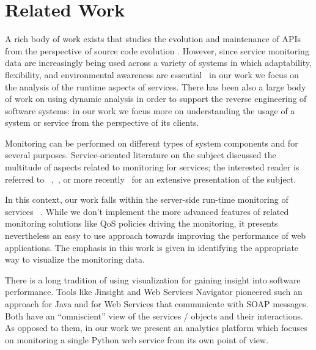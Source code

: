 
\section{Related Work}
\label{sec:related}



A rich body of work exists that studies the evolution and maintenance of APIs from the perspective of source code evolution \cite{dig2006apis, hora2015developers, hora2015apiwave}. However, since service monitoring data are increasingly being used across a variety of systems in which adaptability, flexibility, and environmental awareness are essential~\cite{pernici2016monitoring} in our work we focus on the analysis of the runtime aspects of services. There has been also a large body of work on using dynamic analysis in order to support the reverse engineering of software systems\cite{Corn09-dynamic}: in our work we focus more on understanding the usage of a system or service from the perspective of its clients.

Monitoring can be performed on different types of system components and for several purposes. Service-oriented literature on the subject discussed the multitude of aspects related to monitoring for services; the interested reader is referred to ~\cite{ghezzi2007run},~\cite{metzger2010analytical}, or more recently~\cite{pernici2016monitoring} for an extensive presentation of the subject. 



In this context, our work falls within the server-side run-time monitoring of services ~\cite{ghezzi2007run}. While we don't implement the more advanced features of related monitoring solutions like QoS policies driving the monitoring, it presents nevertheless an easy to use approach towards improving the performance of web applications. The emphasis in this work is given in identifying the appropriate way to visualize the monitoring data.
  
There is a long tradition of using visualization for gaining insight into software performance. Tools like Jinsight \cite{Pauw02a} and Web Services Navigator \cite{Pauw05} pioneered such an approach for Java and for Web Services that communicate with SOAP messages. Both have an ``omniscient'' view of the services / objects and their interactions. As opposed to them, in our work we present an analytics platform which focuses on monitoring a single Python web service from its own point of view.


